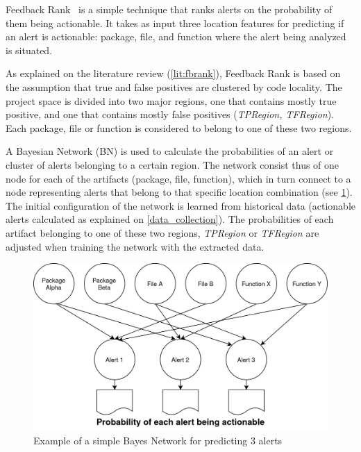 Feedback Rank~\cite{correlation_exploitation} is a simple technique that ranks alerts on the probability of them being actionable.
It takes as input three location features for predicting if an alert is actionable: package, file, and function where the alert being analyzed is situated. 


As explained on the literature review (\cref{lit:fbrank}), Feedback Rank is based on the assumption that true and false positives are clustered by code locality. The project space is divided into two major regions, one that contains mostly true positive, and one that contains mostly false positives (\textit{TPRegion, TFRegion}). Each package, file or function is considered to belong to one of these two regions. 

A Bayesian Network (BN) is used to calculate the probabilities of an alert or cluster of alerts belonging to a certain region. The network consist thus of one node for each of the artifacts (package, file, function), which in turn connect to a node representing alerts that belong to that specific location combination (see \cref{simple_bn}).  
The initial configuration of the network is learned from historical data (actionable alerts calculated as explained on \cref{data_collection}). The probabilities of each artifact belonging to one of these two regions, \textit{TPRegion} or \textit{TFRegion} are adjusted when training the network with the extracted data.

\begin{figure}[H]
	\centering
	\includegraphics[scale=0.2]{./src/bayes_example.png}
	\caption{Example of a simple Bayes Network for predicting 3 alerts}
	\label{simple_bn}
\end{figure}

